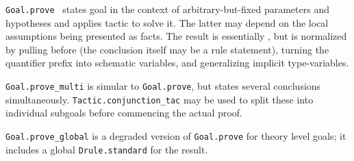 \begin{isabellebody}
\begin{isamarkuptext}
  \begin{description}

  \item \verb|Goal.prove|~ states goal  in the context of arbitrary-but-fixed parameters 
  and hypotheses  and applies tactic  to
  solve it.  The latter may depend on the local assumptions being
  presented as facts.  The result is essentially , but is normalized by pulling \isa{{\isasymAnd}} before \isa{{\isasymLongrightarrow}}
  (the conclusion  itself may be a rule statement), turning
  the quantifier prefix into schematic variables, and generalizing
  implicit type-variables.

  \item \verb|Goal.prove_multi| is simular to \verb|Goal.prove|, but
  states several conclusions simultaneously.  \verb|Tactic.conjunction_tac| may be used to split these into individual
  subgoals before commencing the actual proof.

  \item \verb|Goal.prove_global| is a degraded version of \verb|Goal.prove| for theory level goals; it includes a global \verb|Drule.standard| for the result.

  \end{description}%
\end{isamarkuptext}%
\isamarkuptrue%
%
\endisatagmlref
{\isafoldmlref}%
%
\isadelimmlref
%
\endisadelimmlref
%
\isadelimtheory
%
\endisadelimtheory
%
\isatagtheory
{}\isamarkupfalse%
%
\endisatagtheory
{\isafoldtheory}%
%
\isadelimtheory
%
\endisadelimtheory
\isanewline
\isanewline
\end{isabellebody}%
